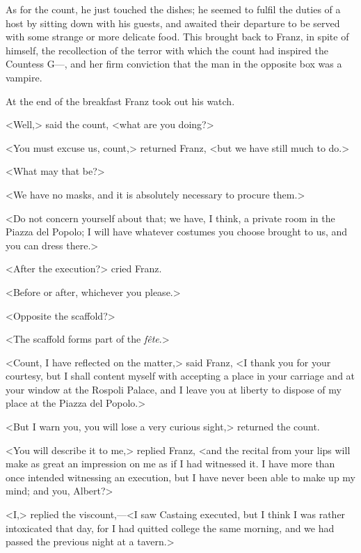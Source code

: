  As for the count, he just touched the dishes; he seemed to fulfil the duties of a host by sitting down with his guests, and awaited their departure to be served with some strange or more delicate food. This brought back to Franz, in spite of himself, the recollection of the terror with which the count had inspired the Countess G—, and her firm conviction that the man in the opposite box was a vampire. 

 At the end of the breakfast Franz took out his watch. 

 <Well,> said the count, <what are you doing?> 

 <You must excuse us, count,> returned Franz, <but we have still much to do.> 

 <What may that be?> 

 <We have no masks, and it is absolutely necessary to procure them.> 

 <Do not concern yourself about that; we have, I think, a private room in the Piazza del Popolo; I will have whatever costumes you choose brought to us, and you can dress there.> 

 <After the execution?> cried Franz. 

 <Before or after, whichever you please.> 

 <Opposite the scaffold?> 

 <The scaffold forms part of the \textit{fête}.> 

 <Count, I have reflected on the matter,> said Franz, <I thank you for your courtesy, but I shall content myself with accepting a place in your carriage and at your window at the Rospoli Palace, and I leave you at liberty to dispose of my place at the Piazza del Popolo.> 

 <But I warn you, you will lose a very curious sight,> returned the count. 

 <You will describe it to me,> replied Franz, <and the recital from your lips will make as great an impression on me as if I had witnessed it. I have more than once intended witnessing an execution, but I have never been able to make up my mind; and you, Albert?> 

 <I,> replied the viscount,—<I saw Castaing executed, but I think I was rather intoxicated that day, for I had quitted college the same morning, and we had passed the previous night at a tavern.> 

